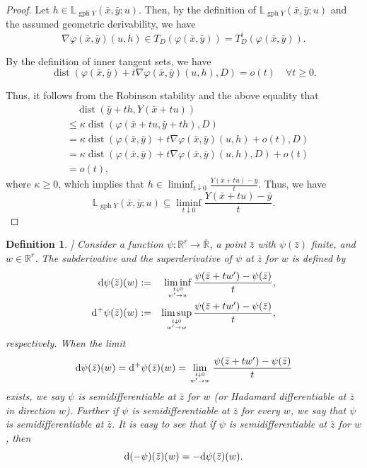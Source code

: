 \documentclass[11pt]{article}
\numberwithin{equation}{section}
\newtheorem{definition}{Definition}[section]
\begin{document}
{\begin{proof}
Let $h \in \mathbb{L}_{\operatorname{gph} Y}(\bar x,\bar y;u)$. Then, by the definition of $\mathbb{L}_{\operatorname{gph} Y}(\bar x,\bar y;u)$ and the assumed geometric derivability, we have
$$
\nabla \varphi(\bar x,\bar y)(u,h) \in T_D(\varphi(\bar x,\bar y)) = T^i_D(\varphi(\bar x,\bar y)).
$$

By the definition of inner tangent sets, we have
$$
\operatorname{dist}\left(\varphi(\bar x,\bar y)+t \nabla \varphi(\bar x,\bar y)(u,h), D\right)=o(t) \quad \forall t \geq 0 .
$$

Thus, it follows from the Robinson stability and the above equality that
$$
\begin{aligned}
& \quad \operatorname{dist}\left(\bar y+th, Y\left(\bar x+tu\right)\right) \\
& \leq \kappa \operatorname{dist}\left(\varphi\left(\bar x+tu, \bar y+th\right), D\right) \\
& =\kappa \operatorname{dist}\left(\varphi(\bar x,\bar y)+t \nabla \varphi(\bar x,\bar y)(u,h) +o(t), D\right) \\
& =\kappa \operatorname{dist}\left(\varphi(\bar x,\bar y)+t \nabla \varphi(\bar x,\bar y)(u,h), D\right) +o(t) \\
& =o(t),
\end{aligned}
$$
where $\kappa \geq 0$, which implies that $h \in \liminf_{t\downarrow 0} \frac{Y(\bar x+tu)-\bar y}{t}$. Thus, we have
$$
\mathbb{L}_{\operatorname{gph} Y}(\bar x,\bar y;u) \subseteq \liminf_{t\downarrow 0} \frac{Y(\bar x+tu)-\bar y}{t}.
$$
\end{proof}



\begin{definition} ]
Consider a function $\psi: \mathbb{R}^r \rightarrow \overline{\mathbb{R}}$, a point $\bar z$ with $\psi(\bar z)$ finite, and $w \in  \mathbb{R}^r$.  The subderivative and the superderivative of  $\psi$ at $\bar z$ for  $w$ is defined by
\begin{eqnarray*} {\rm d}\psi(\bar z)(w)&:=& \liminf\limits_{{t\downarrow 0} \atop {w'\to w}} \frac{\psi(\bar{z}+tw')-\psi(\bar{z})}{t},\\
{\rm d}^+\psi (\bar z)(w) &:=& \limsup\limits_{{t\downarrow 0} \atop {w'\to w}} \frac{\psi(\bar z+tw')-\psi(\bar z)}{t},
\end{eqnarray*}
respectively.
When  the limit
$${\rm d}\psi(\bar z)(w)={\rm d}^+\psi (\bar z)(w)=\lim_{{t\downarrow 0} \atop {w'\to w}} \frac{\psi(\bar z+tw')-\psi(\bar z)}{t}$$  exists, we say $\psi$ is semidifferentiable at $\bar z$ for $w$ (or Hadamard differentiable at $\bar z$ in direction $w$). Further if $\psi$ is semidifferentiable at $\bar z$ for every $w$, we say that $\psi$ is semidifferentiable at $\bar z$. It is easy to see that if $\psi$ is semidifferentiable at $\bar z$ for $w$, then
\begin{equation}\label{eqn2.2new}{\rm d}(-\psi)(\bar z)(w)=-{\rm d}\psi(\bar z)(w).\end{equation}
 \end{definition}

}
\end{document}
